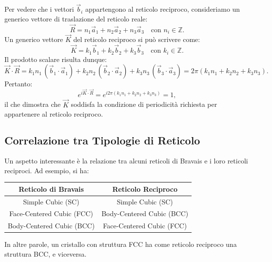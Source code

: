 Per vedere che i vettori \(\vec{b}_i\) appartengono al reticolo reciproco, consideriamo un generico vettore di traslazione del reticolo reale:
\[
\vec{R} = n_1 \vec{a}_1 + n_2 \vec{a}_2 + n_3 \vec{a}_3 \quad \text{con } n_i \in \mathbb{Z}.
\]
Un generico vettore \(\vec{K}\) del reticolo reciproco si può scrivere come:
\[
\vec{K} = k_1 \vec{b}_1 + k_2 \vec{b}_2 + k_3 \vec{b}_3 \quad \text{con } k_i \in \mathbb{Z}.
\]
Il prodotto scalare risulta dunque:
\[
\vec{K} \cdot \vec{R} = k_1 n_1\, (\vec{b}_1 \cdot \vec{a}_1) + k_2 n_2\, (\vec{b}_2 \cdot \vec{a}_2) + k_3 n_3\, (\vec{b}_3 \cdot \vec{a}_3) = 2\pi (k_1 n_1 + k_2 n_2 + k_3 n_3).
\]
Pertanto:
\[
e^{i \vec{K}\cdot \vec{R}} = e^{i 2\pi (k_1 n_1 + k_2 n_2 + k_3 n_3)} = 1,
\]
il che dimostra che \(\vec{K}\) soddisfa la condizione di periodicità richiesta per appartenere al reticolo reciproco.

\subsection*{Correlazione tra Tipologie di Reticolo}

Un aspetto interessante è la relazione tra alcuni reticoli di Bravais e i loro reticoli reciproci. Ad esempio, si ha:
\begin{center}
	\begin{tabular}{|c|c|}
	\hline
	Reticolo di Bravais & Reticolo Reciproco \\ 
	\hline
	Simple Cubic (SC) & Simple Cubic (SC) \\
	\hline
	Face-Centered Cubic (FCC) & Body-Centered Cubic (BCC) \\
	\hline
	Body-Centered Cubic (BCC) & Face-Centered Cubic (FCC) \\
	\hline
	\end{tabular}
\end{center}
In altre parole, un cristallo con struttura FCC ha come reticolo reciproco una struttura BCC, e viceversa.


